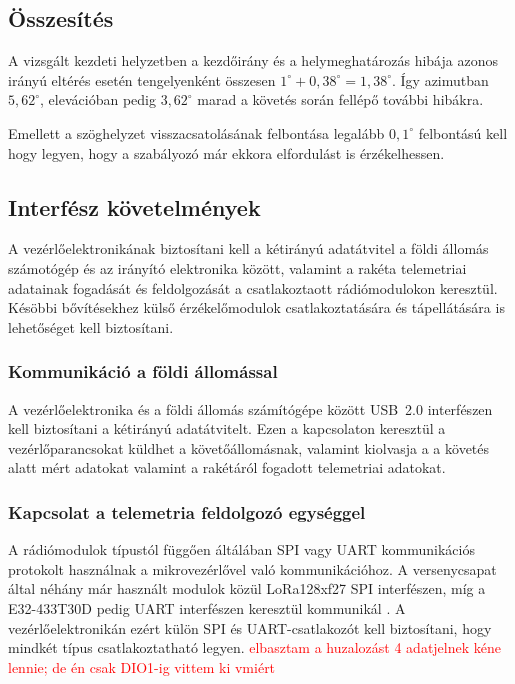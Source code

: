\subsection{Összesítés}
A vizsgált kezdeti helyzetben a kezdőirány és a helymeghatározás
hibája azonos irányú eltérés esetén tengelyenként összesen
$1^\circ + 0{,}38^\circ = 1{,}38^\circ$. Így azimutban
$5{,}62^\circ$, elevációban pedig $3{,}62^\circ$ marad a követés
során fellépő további hibákra.

Emellett a szöghelyzet visszacsatolásának felbontása legalább $0{,}1^\circ$ 
felbontású kell hogy legyen, hogy a szabályozó már ekkora
elfordulást is érzékelhessen.

\subsection{Interfész követelmények}
A vezérlőelektronikának biztosítani kell a kétirányú adatátvitel
a földi állomás számotógép és az irányító elektronika között,
valamint a rakéta telemetriai adatainak fogadását és feldolgozását a 
csatlakoztaott rádiómodulokon keresztül. 
Késöbbi bővítésekhez külső érzékelőmodulok csatlakoztatására és
tápellátására is lehetőséget kell biztosítani.

\subsubsection{Kommunikáció a földi állomással}
A vezérlőelektronika és a földi állomás számítógépe között
USB~2.0 interfészen kell biztosítani a kétirányú adatátvitelt.
Ezen a kapcsolaton keresztül a vezérlőparancsokat 
küldhet a követőállomásnak, valamint kiolvasja a 
a követés alatt mért adatokat valamint a rakétáról fogadott telemetriai adatokat.

\subsubsection{Kapcsolat a telemetria feldolgozó egységgel}
\label{subsubsec:req-kapcsolat-telem}
A rádiómodulok típustól függően áltálában SPI vagy UART kommunikációs protokolt használnak
a mikrovezérlővel való kommunikációhoz. 
A versenycsapat által néhány már használt modulok közül
LoRa128xf27 SPI interfészen, míg a E32-433T30D pedig UART interfészen keresztül
kommunikál\cite{lora128xf27} \cite{e32-433t30d}. A vezérlőelektronikán ezért 
külön SPI és UART-csatlakozót kell biztosítani, hogy mindkét típus csatlakoztatható legyen. 
\textcolor{red}{elbasztam a huzalozást 4 adatjelnek kéne lennie; de én csak DIO1-ig vittem ki vmiért}

